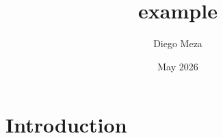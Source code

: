 \documentclass{article}
\title{example}
\author{Diego Meza}
\date{May 2026}
\begin{document}
\maketitle

\section{Introduction}
\end{document}

